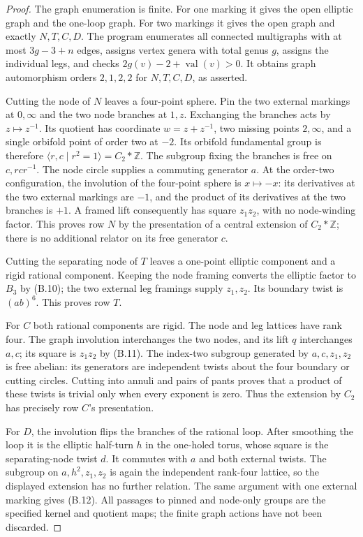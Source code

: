\begin{proof}
The graph enumeration is finite.  For one marking it gives the
open elliptic graph and the one-loop graph.  For two markings it
gives the open graph and exactly $N,T,C,D$.  The program enumerates
all connected multigraphs with at most $3g-3+n$ edges, assigns vertex
genera with total genus $g$, assigns the individual legs, and checks
$2g(v)-2+\operatorname{val}(v)>0$.  It obtains graph automorphism
orders $2,1,2,2$ for $N,T,C,D$, as asserted.

Cutting the node of $N$ leaves a four-point sphere.  Pin the two
external markings at $0,\infty$ and the two node branches at $1,z$.
Exchanging the branches acts by $z\mapsto z^{-1}$.  Its quotient has
coordinate $w=z+z^{-1}$, two missing points $2,\infty$, and a single
orbifold point of order two at $-2$.  Its orbifold fundamental group
is therefore $\langle r,c\mid r^2=1\rangle=C_2*\mathbb Z$.
The subgroup fixing the branches is free on $c,rcr^{-1}$.  The
node circle supplies a commuting generator $a$.  At the order-two
configuration, the involution of the four-point sphere is
$x\mapsto-x$: its derivatives at the two external markings are
$-1$, and the product of its derivatives at the two branches is
$+1$.  A framed lift consequently has square $z_1z_2$, with no
node-winding factor.  This proves row $N$ by the presentation of a
central extension of $C_2*\mathbb Z$; there is no additional
relator on its free generator $c$.

Cutting the separating node of $T$ leaves a one-point elliptic
component and a rigid rational component.  Keeping the node
framing converts the elliptic factor to $B_3$ by (B.10); the two
external leg framings supply $z_1,z_2$.  Its boundary twist is
$(ab)^6$.  This proves row $T$.

For $C$ both rational components are rigid.  The node and leg
lattices have rank four.  The graph involution interchanges the two
nodes, and its lift $q$ interchanges $a,c$; its square is $z_1z_2$
by (B.11).  The index-two subgroup generated by
$a,c,z_1,z_2$ is free abelian: its generators are independent twists
about the four boundary or cutting circles.  Cutting into annuli
and pairs of pants proves that a product of these twists is
trivial only when every exponent is zero.  Thus the extension by
$C_2$ has precisely row $C$'s presentation.

For $D$, the involution flips the branches of the rational loop.
After smoothing the loop it is the elliptic half-turn $h$ in the
one-holed torus, whose square is the separating-node twist $d$.
It commutes with $a$ and both external twists.  The subgroup on
$a,h^2,z_1,z_2$ is again the independent rank-four lattice, so the
displayed extension has no further relation.  The same argument
with one external marking gives (B.12).  All passages to pinned
and node-only groups are the specified kernel and quotient maps;
the finite graph actions have not been discarded.
\end{proof}

